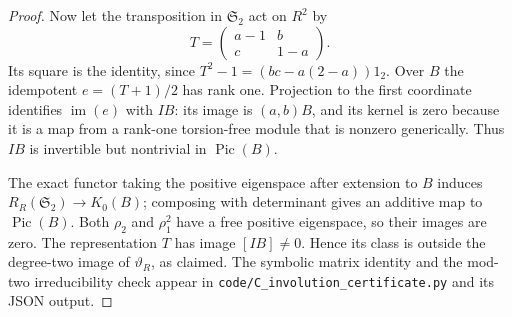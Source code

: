 \begin{proof}
Now let the transposition in $\mathfrak S_2$ act on $R^2$ by
\[
 T=\begin{pmatrix}a-1&b\\c&1-a\end{pmatrix}.
\]
Its square is the identity, since $T^2-1=(bc-a(2-a))1_2$.
Over $B$ the idempotent $e=(T+1)/2$ has rank one. Projection to the first
coordinate identifies $\operatorname{im}(e)$ with $IB$: its image is
$(a,b)B$, and its kernel is zero because it is a map from a rank-one
torsion-free module that is nonzero generically. Thus $IB$ is invertible
but nontrivial in $\operatorname{Pic}(B)$.

The exact functor taking the positive eigenspace after extension to $B$
induces $R_R(\mathfrak S_2)\to K_0(B)$; composing with determinant gives
an additive map to $\operatorname{Pic}(B)$. Both $\rho_2$ and $\rho_1^2$
have a free positive eigenspace, so their images are zero. The representation
$T$ has image $[IB]\ne0$. Hence its class is outside the degree-two image
of $\vartheta_R$, as claimed. The symbolic matrix identity and the
mod-two irreducibility check appear in
\texttt{code/C\_involution\_certificate.py} and its JSON output.
\end{proof}
